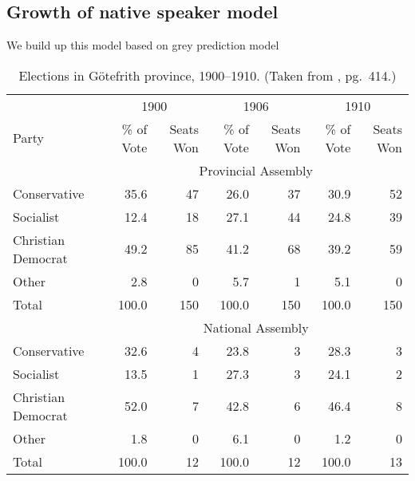 \documentclass{mcmthesis}
\begin{document}
\subsection{Growth of native speaker model}
\qquad We build up this model based on grey prediction model
\begin{table}
\begin{center}
{\hspace{-1in}
\begin{minipage}{\textwidth}
\fontsize{10}{12}\selectfont
\begin{tabular}[c]{lrrrrrr}
\toprule
              & \multicolumn{2}{c}{1900} & \multicolumn{2}{c}{1906} & \multicolumn{2}{c}{1910}\\
\cmidrule(r){2-3}\cmidrule(lr){4-5}\cmidrule(l){6-7}
Party         & \% of Vote  & Seats Won  & \% of Vote  & Seats Won  & \% of Vote  & Seats Won \\
\midrule
\addlinespace
              & \multicolumn{6}{c}{Provincial Assembly}\\
\cmidrule{2-7}
Conservative  & 35.6        &  47        & 26.0        & 37         & 30.9        & 52\\
Socialist     & 12.4        &  18        & 27.1        & 44         & 24.8        & 39\\
Christian Democrat & 49.2   &  85        & 41.2        & 68         & 39.2        & 59\\
Other         & 2.8         &  0         & 5.7         & 1          & 5.1         & 0\\
\addlinespace
Total& 100.0       &  150       & 100.0       & 150        & 100.0       & 150\\
\addlinespace
              & \multicolumn{6}{c}{National Assembly}\\
\cmidrule{2-7}
Conservative  & 32.6        &   4        & 23.8        &  3         & 28.3        & 3\\
Socialist     & 13.5        &   1        & 27.3        &  3         & 24.1        & 2\\
Christian Democrat & 52.0   &   7        & 42.8        &  6         & 46.4        & 8\\
Other         & 1.8         &   0        & 6.1         &  0         & 1.2         & 0\\
\addlinespace
Total& 100.0       &  12        & 100.0       & 12         & 100.0       & 13\\
\bottomrule
\end{tabular}
\end{minipage}
}
\caption[Elections in G\"{o}tefrith province, 1900--1910]{Elections in
  G\"{o}tefrith province, 1900--1910.  (Taken from \cite{chicago},
  pg.~414.)}%
\label{tab:chicago-table}
\end{center}
\end{table}
\end{document}
